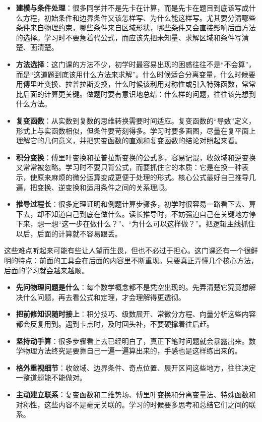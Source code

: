 \begin{itemize}
    \item \textbf{建模与条件处理}：很多同学并不是先卡在计算，而是先卡在题目到底该写成什么方程，初始条件和边界条件又该怎样写、为什么能这样写。尤其要分清哪些条件来自物理约束，哪些条件来自区域形状，哪些条件又会直接影响后面方法的选择。学习时不要急着代公式，而应该先把未知量、求解区域和条件写清楚、画清楚。
    
    \item \textbf{方法选择}：这门课的方法不少，初学时最容易出现的困惑往往不是``不会算''，而是``这道题到底该用什么方法来求解''。什么时候适合分离变量，什么时候要用傅里叶变换、拉普拉斯变换，什么时候该利用对称性或引入特殊函数，常常比后面的计算更关键。做题时要有意识地总结：什么样的问题，往往该先想到什么方法。
    
    \item \textbf{复变函数}：从实数到复数的思维转换需要时间适应。复变函数的``导数''定义，形式上与实函数相似，但条件要苛刻得多。学习时要多画图，尽量在复平面上理解它的几何意义，并把实变函数的直观和复变函数的结论对照起来看。
    
    \item \textbf{积分变换}：傅里叶变换和拉普拉斯变换的公式多，容易记混，收敛域和逆变换又常常被忽略。学习时不要只背公式，而要抓住它的本质：它是在换一种表示，使原来麻烦的微分运算变成更便于处理的形式。核心公式最好自己推导几遍，把变换、逆变换和适用条件之间的关系理顺。
    
    \item \textbf{推导过程长}：很多定理证明和例题计算步骤多，初学时很容易一路看下去、算下去，却不知道自己到底在做什么。读长推导时，不妨强迫自己在关键地方停下来，想一想``这一步在做什么？''、``为什么可以这样做？''。把逻辑主线抓住以后，后面的计算就不容易跟丢。
\end{itemize}

这些难点听起来可能有些让人望而生畏，但也不必过于担心。这门课还有一个很鲜明的特点：前面的工具会在后面的内容里不断重现。只要真正弄懂几个核心方法，后面的学习就会越来越顺。

\begin{itemize}
    \item \textbf{先问物理问题是什么}：每个数学概念都不是凭空出现的。先弄清楚它究竟想解决什么问题，再去看公式和定理，才会理解得更透彻。
    
    \item \textbf{把前修知识随时接上}：积分技巧、级数展开、常微分方程、向量分析这些内容都会反复用到。遇到卡点时，及时回头补，不要硬撑着往后赶。
    
    \item \textbf{坚持动手算}：很多步骤看上去已经明白了，真正下笔时问题就会暴露出来。数学物理方法终究是要靠自己一遍一遍算出来的，手感也是这样练出来的。
    
    \item \textbf{格外重视细节}：收敛域、边界条件、奇点位置、展开区间这些地方，往往决定一整道题能不能做对。
    
    \item \textbf{主动建立联系}：复变函数和二维势场、傅里叶变换和分离变量法、特殊函数和对称性，这些内容不是毫无关联的。学习的时候要多思考和总结它们之间的联系。
\end{itemize}

